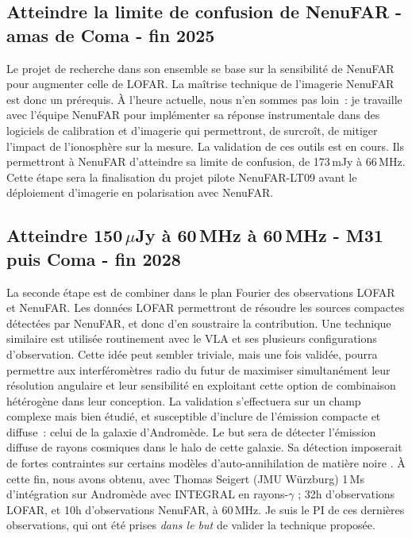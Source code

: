 

\subsection{Atteindre la limite de confusion de NenuFAR - amas de Coma - fin 2025}

\pg
Le projet de recherche dans son ensemble se base sur la sensibilit\'e de NenuFAR pour augmenter celle de LOFAR. La ma\^itrise technique de l'imagerie NenuFAR est donc un pr\'erequis. \`A l'heure actuelle, nous n'en sommes pas loin~: je travaille avec l'\'equipe NenuFAR pour impl\'ementer sa r\'eponse instrumentale dans des logiciels de calibration et d'imagerie qui permettront, de surcro\^it, de mitiger l'impact de l'ionosph\`ere sur la mesure. La validation de ces outils est en cours. Ils permettront \`a NenuFAR d'atteindre sa limite de confusion, de 173\,mJy \`a 66\,MHz. Cette \'etape sera la finalisation du projet pilote NenuFAR-LT09 avant le d\'eploiement d'imagerie en polarisation avec NenuFAR. %

\subsection{Atteindre  150\,$\mu$Jy \`a 60\,MHz \`a 60\,MHz - M31 puis Coma - fin 2028}

\pg
La seconde \'etape est de combiner dans le plan Fourier des observations LOFAR et NenuFAR. Les donn\'ees LOFAR permettront de r\'esoudre les sources compactes d\'etect\'ees par NenuFAR, et donc d'en soustraire la contribution. Une technique similaire est utilis\'ee routinement avec le VLA \citep{1980ApJS...44..151T} et ses plusieurs configurations d'observation. Cette id\'ee peut sembler triviale, mais une fois valid\'ee, pourra permettre aux interf\'erom\`etres radio du futur de maximiser simultan\'ement leur r\'esolution angulaire et leur sensibilit\'e en exploitant cette option de combinaison h\'et\'erog\`ene dans leur conception. La validation s'effectuera sur un champ complexe mais bien \'etudi\'e, et susceptible d'inclure de l'\'emission compacte et diffuse~: celui de la galaxie d'Androm\`ede. Le but sera de d\'etecter l'\'emission diffuse de rayons cosmiques dans le halo de cette galaxie. Sa d\'etection imposerait de fortes contraintes sur certains mod\`eles d'auto-annihilation de mati\`ere noire \citep[e.g.][]{2016JCAP...11..021L,2022PhRvL.129k1103M}. \`A cette fin, nous avons obtenu, avec Thomas Seigert (JMU W\"urzburg) 1\,Ms d'int\'egration sur Androm\`ede avec INTEGRAL en rayons-$\gamma$ \citep{2003A&A...411L...1W}; 32h d'observations LOFAR, et 10h d'observations NenuFAR, \`a 60\,MHz. Je suis le PI de ces derni\`eres observations, qui ont \'et\'e prises \textit{dans le but} de valider la technique propos\'ee.%

